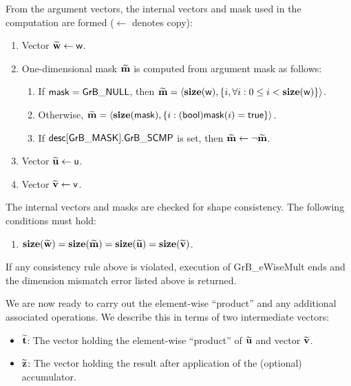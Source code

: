 From the argument vectors, the internal vectors and mask used in 
the computation are formed ($\leftarrow$ denotes copy):
\begin{enumerate}
	\item Vector ${\bf \widetilde{w}} \leftarrow {\sf w}$.

	\item One-dimensional mask ${\bf \widetilde{m}}$ is computed from 
    argument {\sf mask} as follows:
	\begin{enumerate}
		\item	If ${\sf mask} = {\sf GrB\_NULL}$, then ${\bf \widetilde{m}} = 
        \langle \bold{size}({\sf w}), \{i, \forall i : 0 \leq i < 
        \bold{size}({\sf w}) \} \rangle$.

		\item	Otherwise, ${\bf \widetilde{m}} = 
        \langle \bold{size}({\sf mask}), \{i : ({\sf bool}){\sf mask}(i) = 
        {\sf true}\} \rangle$.

		\item	If ${\sf desc[GrB\_MASK].GrB\_SCMP}$ is set, then ${\bf \widetilde{m}} \leftarrow \neg {\bf \widetilde{m}}$.
	\end{enumerate}

	\item Vector ${\bf \widetilde{u}} \leftarrow {\sf u}$.

	\item Vector ${\bf \widetilde{v}} \leftarrow {\sf v}$.
\end{enumerate}

The internal vectors and masks are checked for shape consistency. The following 
conditions must hold:
\begin{enumerate}
	\item $\bold{size}({\bf \widetilde{w}}) = \bold{size}({\bf \widetilde{m}})
    = \bold{size}({\bf \widetilde{u}}) = \bold{size}({\bf \widetilde{v}})$.
\end{enumerate}
If any consistency rule above is violated, execution of {\sf GrB\_eWiseMult} ends and 
the dimension mismatch error listed above is returned.

We are now ready to carry out the element-wise ``product'' and any additional 
associated operations.  We describe this in terms of two intermediate vectors:
\begin{itemize}
	\item ${\bf \widetilde{t}}$: The vector holding the element-wise ``product'' of
    ${\bf \widetilde{u}}$ and vector ${\bf \widetilde{v}}$.
	\item ${\bf \widetilde{z}}$: The vector holding the result after 
    application of the (optional) accumulator.
\end{itemize}

